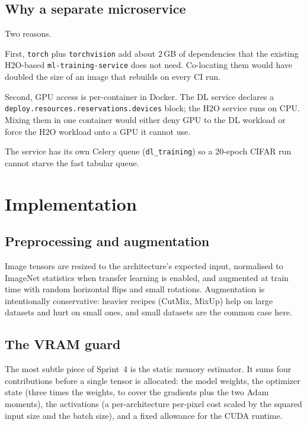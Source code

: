 \documentclass[12pt, a4paper, oneside]{report}
\begin{document}
\subsection{Why a separate microservice}

Two reasons.

First, \texttt{torch} plus \texttt{torchvision} add about $2$\,GB of
dependencies that the existing H2O-based
\texttt{ml-training-service} does not need. Co-locating them would
have doubled the size of an image that rebuilds on every CI run.

Second, GPU access is per-container in Docker. The DL service
declares a \texttt{deploy.resources.reservations.devices} block; the
H2O service runs on CPU. Mixing them in one container would either
deny GPU to the DL workload or force the H2O workload onto a GPU it
cannot use.

The service has its own Celery queue (\texttt{dl\_training}) so a
20-epoch CIFAR run cannot starve the fast tabular queue.

\section{Implementation}

\subsection{Preprocessing and augmentation}

Image tensors are resized to the architecture's expected input,
normalised to ImageNet statistics when transfer learning is enabled,
and augmented at train time with random horizontal flips and small
rotations. Augmentation is intentionally conservative: heavier
recipes (CutMix, MixUp) help on large datasets and hurt on small
ones, and small datasets are the common case here.

\subsection{The VRAM guard}

The most subtle piece of Sprint~4 is the static memory estimator. It
sums four contributions before a single tensor is allocated: the model
weights, the optimizer state (three times the weights, to cover the
gradients plus the two Adam moments), the activations (a per-architecture
per-pixel cost scaled by the squared input size and the batch size), and
a fixed allowance for the CUDA runtime.
\end{document}
